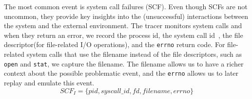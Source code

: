 The most common event is system call failures (SCF).
Even though SCFs are not uncommon, they provide key insights into the (unsuccessful) interactions between the system and the external environment.
The tracer monitors system calls and when they return an error, we record the process id, the system call id~\cite{syscallids}, the file descriptor(for file-related I/O operations), and the \texttt{errno} return code.
For file-related system calls that use the filename instead of the file descriptors, such as \texttt{open} and \texttt{stat}, we capture the filename.
The filename allows us to have a richer context about the possible problematic event, and the \texttt{errno} allows us to later replay and emulate this event.
\[ SCF_I = \{pid, syscall\_id, fd,filename, errno\}  \]




